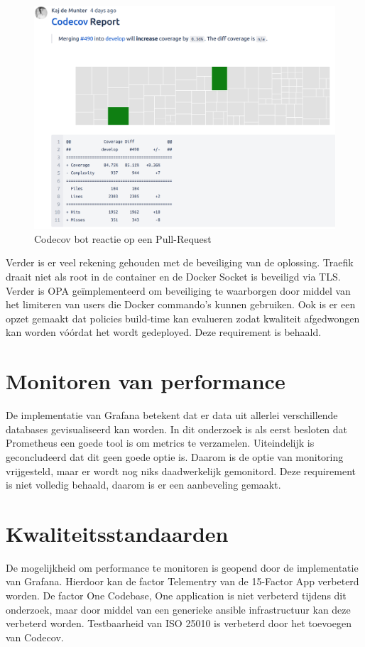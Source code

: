 \begin{figure}[H]
	\centering
	\includegraphics[width=13cm]{Figures/coverage}
	\decoRule
	\caption[Codecov bot]{Codecov bot reactie op een Pull-Request}
	\label{fig:coverage}
\end{figure}

Verder is er veel rekening gehouden met de beveiliging van de oplossing. Traefik draait niet als root in de container en de Docker Socket is beveiligd via TLS. Verder is OPA geïmplementeerd om beveiliging te waarborgen door middel van het limiteren van users die Docker commando's kunnen gebruiken. Ook is er een opzet gemaakt dat policies build-time kan evalueren zodat kwaliteit afgedwongen kan worden vóórdat het wordt gedeployed. Deze requirement is behaald.

\section{Monitoren van performance}

De implementatie van Grafana betekent dat er data uit allerlei verschillende databases gevisualiseerd kan worden. In dit onderzoek is als eerst besloten dat Prometheus een goede tool is om metrics te verzamelen. Uiteindelijk is geconcludeerd dat dit geen goede optie is. Daarom is de optie van monitoring vrijgesteld, maar er wordt nog niks daadwerkelijk gemonitord. Deze requirement is niet volledig behaald, daarom is er een aanbeveling gemaakt.

\section{Kwaliteitsstandaarden}
De mogelijkheid om performance te monitoren is geopend door de implementatie van Grafana. Hierdoor kan de factor Telementry van de 15-Factor App verbeterd worden. De factor One Codebase, One application is niet verbeterd tijdens dit onderzoek, maar door middel van een generieke ansible infrastructuur kan deze verbeterd worden. Testbaarheid van ISO 25010 is verbeterd door het toevoegen van Codecov. 

